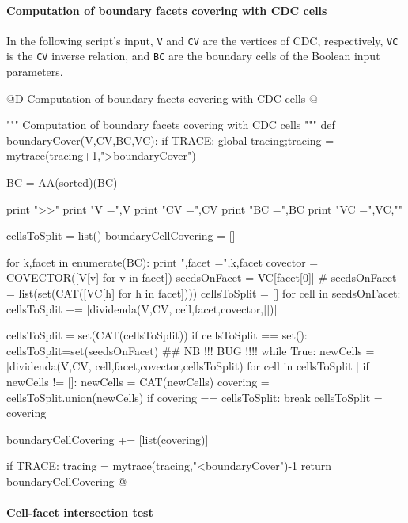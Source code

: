 \documentclass[11pt,oneside]{article}	%
\begin{document}
\paragraph{Computation of boundary facets covering with CDC cells}

In the following script's input, \texttt{V} and  \texttt{CV} are the vertices of CDC, respectively, \texttt{VC} is the \texttt{CV} inverse relation, and \texttt{BC} are the boundary cells of the Boolean input parameters.



@D Computation of boundary facets covering with CDC cells
@{""" Computation of boundary facets covering with CDC cells """
def boundaryCover(V,CV,BC,VC):
	if TRACE: global tracing;tracing = mytrace(tracing+1,">boundaryCover")

	BC = AA(sorted)(BC)

	print "\nboundaryCover >>"
	print "V =",V
	print "CV =",CV
	print "BC =",BC
	print "VC =",VC,"\n"

	cellsToSplit = list()
	boundaryCellCovering = []

	for k,facet in enumerate(BC):
		print "\nk,facet =",k,facet
		covector = COVECTOR([V[v] for v in facet])
		seedsOnFacet = VC[facet[0]] 
		# seedsOnFacet = list(set(CAT([VC[h] for h in facet])))
		cellsToSplit = []
		for cell in seedsOnFacet:
			cellsToSplit += [dividenda(V,CV, cell,facet,covector,[])]
				
		cellsToSplit = set(CAT(cellsToSplit))		
		if cellsToSplit == set(): cellsToSplit=set(seedsOnFacet) ## NB !!!  BUG !!!!
		while True:
			newCells = [dividenda(V,CV, cell,facet,covector,cellsToSplit) 
							for cell in cellsToSplit ]
			if newCells != []: newCells = CAT(newCells)
			covering = cellsToSplit.union(newCells)
			if covering == cellsToSplit: 
				break
			cellsToSplit = covering
			
		boundaryCellCovering += [list(covering)]	

	if TRACE: tracing = mytrace(tracing,"<boundaryCover")-1
	return boundaryCellCovering
@}

\paragraph{Cell-facet intersection test}
\end{document}
